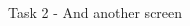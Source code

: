 \begin{frame}{Task 2 - And another screen}
\begin{columns}
\begin{column}{0.5\textwidth}
\begin{figure}[h]
{                    
                }
            \end{figure}
        \end{column}
    \end{columns}
\end{frame}